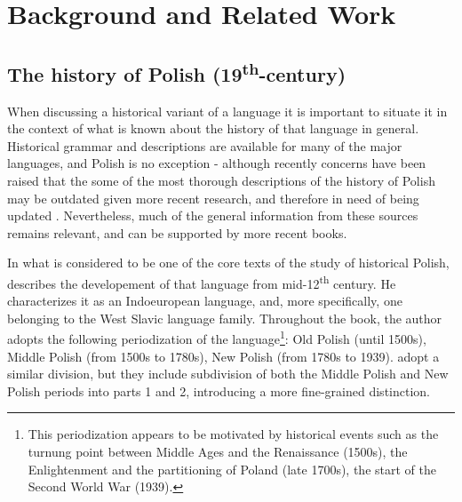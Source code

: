\section{Background and Related Work}
\label{sec:background}

\subsection{The history of Polish (19\textsuperscript{th}-century)}
\label{subsec:history-pl}

When discussing a historical variant of a language it is important to situate it in the context of what is known about the history of that language in general. Historical grammar and descriptions are available for many of the major languages, and Polish is no exception - although recently concerns have been raised that the some of the most thorough descriptions of the history of Polish may be outdated given more recent research, and therefore in need of being updated \citep{dunaj_19}. Nevertheless, much of the general information from these sources remains relevant, and can be supported by more recent books.

In what is considered to be one of the core texts of the study of historical Polish, \citet{klemensiewicz_76} describes the developement of that language from mid-12\textsuperscript{th} century. He characterizes it as an Indoeuropean language, and, more specifically, one belonging to the West Slavic language family. Throughout the book, the author adopts the following periodization of the language\footnote{This periodization appears to be motivated by historical events such as the turnung point between Middle Ages and the Renaissance (1500s), the Enlightenment and the partitioning of Poland (late 1700s), the start of the Second World War (1939).}: Old Polish (until 1500s), Middle Polish (from 1500s to 1780s), New Polish (from 1780s to 1939). \citet{długosz-kurczabowa_dubisz_2006} adopt a similar division, but they include subdivision of both the Middle Polish and New Polish periods into parts 1 and 2, introducing a more fine-grained distinction. 

